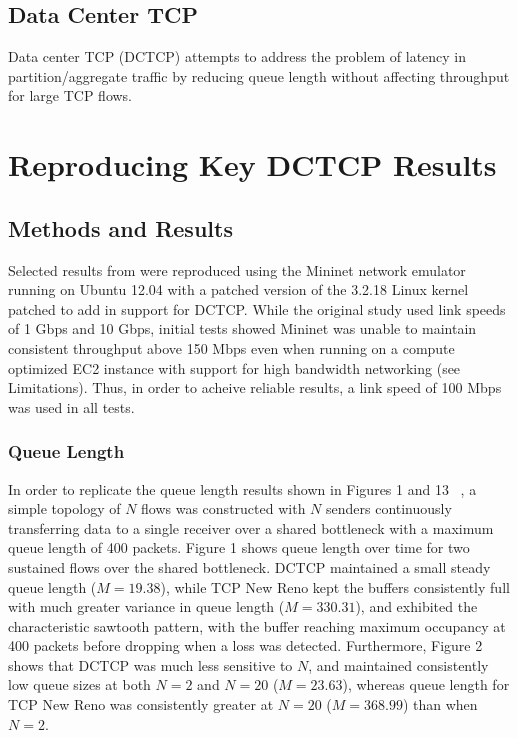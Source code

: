 \subsection{Data Center TCP}

Data center TCP (DCTCP) attempts to address the problem of latency in partition/aggregate traffic by reducing queue length without affecting throughput for large TCP flows.

\section{Reproducing Key DCTCP Results}

\subsection{Methods and Results}

Selected results from \cite{alizadeh_data_2010} were reproduced using the Mininet network emulator running on Ubuntu 12.04 with a patched version of the 3.2.18 Linux kernel patched to add in support for DCTCP. While the original study used link speeds of 1 Gbps and 10 Gbps, initial tests showed Mininet was unable to maintain consistent throughput above 150 Mbps even when running on a compute optimized EC2 instance with support for high bandwidth networking (see Limitations). Thus, in order to acheive reliable results, a link speed of 100 Mbps was used in all tests.

\subsubsection{Queue Length}

In order to replicate the queue length results shown in Figures 1 and 13 ~\cite{alizadeh_data_2010}, a simple topology of $N$ flows was constructed with $N$ senders continuously transferring data to a single receiver over a shared bottleneck with a maximum queue length of 400 packets. Figure 1 shows queue length over time for two sustained flows over the shared bottleneck. DCTCP maintained a small steady queue length ($M = 19.38$), while TCP New Reno kept the buffers consistently full with much greater variance in queue length ($M = 330.31$), and exhibited the characteristic sawtooth pattern, with the buffer reaching maximum occupancy at 400 packets before dropping when a loss was detected. Furthermore, Figure 2 shows that DCTCP was much less sensitive to $N$, and maintained consistently low queue sizes at both $N = 2$ and $N = 20$ ($M = 23.63$), whereas queue length for TCP New Reno was consistently greater at $N = 20$ ($M = 368.99$) than when $N = 2$.

